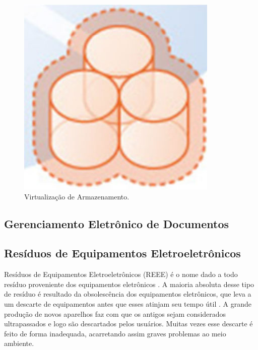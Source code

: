 \begin{itemize}
    \begin{figure}[htb]
    	\caption{\label{fig_virt_arm}Virtualização de Armazenamento.}
    	\begin{center}
    	    \includegraphics[scale=0.3]{imagens/virtualizacao-armazenamento.jpg}
    	\end{center}
    \end{figure}
\end{itemize}

\subsection{Gerenciamento Eletrônico de Documentos}

    
\lipsum[1]
\lipsum[2]
\lipsum[3]

\subsection{Resíduos de Equipamentos Eletroeletrônicos}

Resíduos de Equipamentos Eletroeletrônicos (REEE) é o nome dado a todo resíduo proveniente dos equipamentos eletrônicos \cite[p. 2]{natume2011residuos}. A maioria absoluta desse tipo de resíduo é resultado da obsolescência dos equipamentos eletrônicos, que leva a um descarte de equipamentos antes que esses atinjam seu tempo útil \cite[p. 2]{da2010lixo}. A grande produção de novos aparelhos faz com que os antigos sejam considerados ultrapassados e logo são descartados pelos usuários. Muitas vezes esse descarte é feito de forma inadequada, acarretando assim graves problemas ao meio ambiente.


